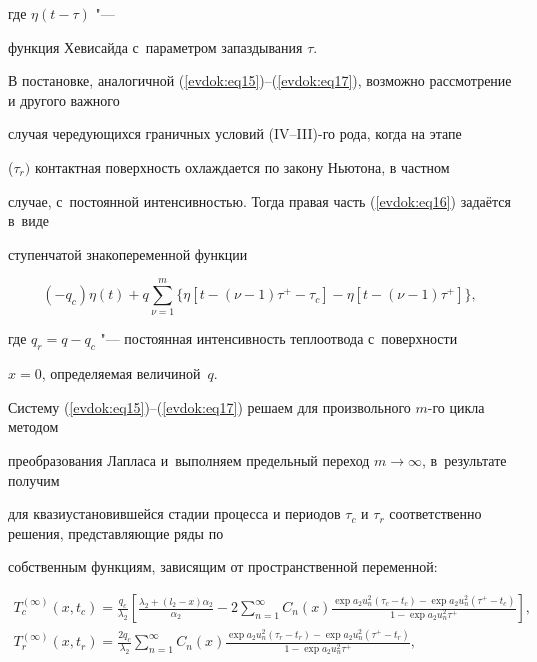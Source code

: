 где $\eta (t-\tau )$ "--- %

функция Хевисайда с~параметром запаздывания $\tau$. 



В постановке, аналогичной (\ref{evdok:eq15})--(\ref{evdok:eq17}), возможно рассмотрение и другого важного 

случая чередующихся граничных условий (IV--III)-го рода, когда на этапе 

($\tau _r )$ контактная поверхность охлаждается по закону Ньютона, в частном 

случае, с~постоянной интенсивностью. Тогда правая часть (\ref{evdok:eq16}) за\-даёт\-ся в~виде 

ступенчатой знакопеременной функции 

\[

( - q_c )\eta (t) + q\sum\limits_{\nu = 1}^m \Big\{ \eta \left[ {t - 

\left( {\nu - 1} \right)\tau ^ + - \tau _c } \right] - \eta \left[ t - (\nu 

- 1)\tau ^ +  \right] \Big\} ,

\]

где $q_r = q - q_c $ "--- постоянная интенсивность теплоотвода с~поверхности 

$x = 0$, определяемая величиной~$q$. 





Систему (\ref{evdok:eq15})--(\ref{evdok:eq17}) решаем для произвольного $m$-го цикла методом 

преобразования Лапласа и~выполняем предельный переход $m \to \infty $, в~результате получим 

для квазиустановившейся стадии процесса и периодов $\tau 

_c $ и $\tau _r $ соответственно решения, представляющие ряды по 

собственным функциям, зависящим от пространственной переменной:

\begin{gather}

\label{evdok:eq18}

T_c^{(\infty )} (x,t_c ) = \frac{q_c }{\lambda _2 }\left[ {\frac{\lambda _2 

+ (l_2 - x)\alpha _2 }{\alpha _2 } - 2\sum\limits_{n = 1}^\infty {C_n 

(x)\frac{\exp a_2 u_n^2 (\tau _c - t_c ) - \exp a_2 u_n^2 (\tau ^ + - t_c 

)}{1 - \exp a_2 u_n^2 \tau ^ + }} } \right],\\

\label{evdok:eq19}

T_r^{(\infty )} (x,t_r ) = \frac{2q_c }{\lambda _2 }\sum\limits_{n = 

1}^\infty {C_n (x)\frac{\exp a_2 u_n^2 (\tau _r - t_r ) - \exp a_2 u_n^2 

(\tau ^ + - t_r )}{1 - \exp a_2 u_n^2 \tau ^ + }} ,

\end{gather}

